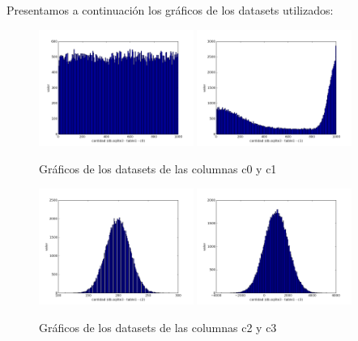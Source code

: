 Presentamos a continuación los gráficos de los datasets utilizados:

\begin{figure}[h!]
  \centering
  \includegraphics[width=0.45\textwidth]{./images/c0}
  \includegraphics[width=0.45\textwidth]{./images/c1}
  \caption{Gráficos de los datasets de las columnas c0 y c1}
 \end{figure}
 
 
\begin{figure}[h!]
  \centering
  \includegraphics[width=0.45\textwidth]{./images/c2}
  \includegraphics[width=0.45\textwidth]{./images/c3}
  \caption{Gráficos de los datasets de las columnas c2 y c3}
 \end{figure}
 
